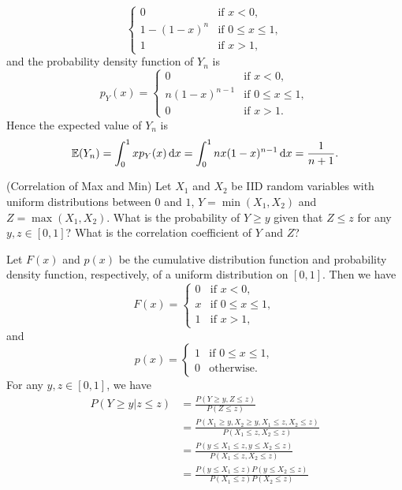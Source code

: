 \documentclass[12pt,letterpaper, onecolumn]{exam}
\begin{document}
\begin{questions}
\begin{solution}
$$\begin{cases}
                0&\text{if $x<0$},\\
                1-(1-x)^n&\text{if $0\le x\le 1$},\\
                1&\text{if $x>1$},
            \end{cases}$$
            and the probability density function of $Y_n$ is
            $$p_Y(x)=\begin{cases}
                0&\text{if $x<0$},\\
                n(1-x)^{n-1}&\text{if $0\le x\le 1$},\\
                0&\text{if $x>1$}.
            \end{cases}$$
            Hence the expected value of $Y_n$ is
            $$\mathbb{E}(Y_n)=\int_0^1xp_Y(x)\,{\rm{d}}x=\int_0^1nx(1-x)^{n-1}\,{\rm{d}}x=\frac{1}{n+1}.$$
        \end{solution}
        \question[](Correlation of Max and Min) Let $X_1$ and $X_2$ be IID random variables with uniform distributions between $0$ and $1$, $Y=\min(X_1,X_2)$ and $Z=\max(X_1,X_2)$. What is the probability of $Y\ge y$ given that $Z\le z$ for any $y,z\in[0,1]$? What is the correlation coefficient of $Y$ and $Z$?
        \begin{solution}
        Let $F(x)$ and $p(x)$ be the cumulative distribution function and probability density function, respectively, of a uniform distribution on $[0,1]$. Then we have
            $$F(x)=\begin{cases}
                0&\text{if $x<0$},\\
                x&\text{if $0\le x\le 1$},\\
                1&\text{if $x>1$},
            \end{cases}$$
            and
            $$p(x)=\begin{cases}
                1&\text{if $0\le x\le 1$},\\
                0&\text{otherwise}.
            \end{cases}$$
            For any $y,z\in[0,1]$, we have 
            \begin{align*}
                P(Y\ge y|z\le z)&=\frac{P(Y\ge y,Z\le z)}{P(Z\le z)}\\
                &=\frac{P(X_1\ge y,X_2\ge y,X_1\le z,X_2\le z)}{P(X_1\le z,X_2\le z)}\\
                &=\frac{P(y\le X_1\le z,y\le X_2\le z)}{P(X_1\le z,X_2\le z)}\\
                &=\frac{P(y\le X_1\le z)P(y\le X_2\le z)}{P(X_1\le z)P(X_2\le z)}\\

\end{align*}
\end{solution}
\end{questions}
\end{document}
